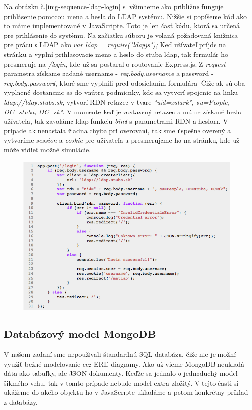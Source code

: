 Na obrázku č.\ref{img-sequence-ldap-login} si všimneme ako približne funguje prihlásenie pomocou mena a hesla do LDAP systému. Nižšie si popíšeme kód ako to máme implementované v JavaScripte. Toto je len časť kódu, ktorá sa určená pre prihlásenie do systému. Na začiatku súboru je volaná požadovaná knižnica pre prácu s LDAP ako \textit{var ldap = require("ldapjs");}
Keď užívateľ príjde na stránku a vyplní prihlasovacie meno a heslo do stuba ldap, tak formulár ho presmeruje na \textit{/login}, kde už sa postaral o routovanie Express.js. Z \textit{request} parametra získame zadané username - \textit{req.body.username} a password - \textit{req.body.password}, ktoré sme vyplnili pred odosielaním formulára. Čiže ak sú oba vyplnené dostaneme sa do vnútra podmienky, kde sa vytvorí spojenie na linku \textit{ldap://ldap.stuba.sk}, vytvorí RDN reťazec v tvare \textit{"uid=xstark", ou=People, DC=stuba, DC=sk"}.
V momente keď je zostavený reťazec a máme získané heslo užívateľa, tak zavoláme ldap funkciu \textit{bind} s parametrami RDN a heslom. V prípade ak nenastala žiadna chyba pri overovaní, tak sme úspešne overený a vytvoríme \textit{session} a \textit{cookie} pre užívateľa a presmerujeme ho na stránku, kde už môže vidieť možné simulácie.

\begin{figure}[H]
  \centering
  \includegraphics[scale=0.7]{img/code/ldap-login.png}
\end{figure}

\subsection{Databázový model MongoDB}
V našom zadaní sme nepoužívali štandardnú SQL databázu, čiže nie je možné využiť bežné modelovanie cez ERD diagramy. Ako už vieme MongoDB neukladá dáta ako tabuľky, ale JSON dokumenty. Keďže sa jednalo o jednoduchý model šikmého vrhu, tak v tomto prípade nebude model extra zložitý. V tejto časti si ukážeme do akého objektu ho v JavaScripte ukladáme a potom konkrétny príklad z databázy.

